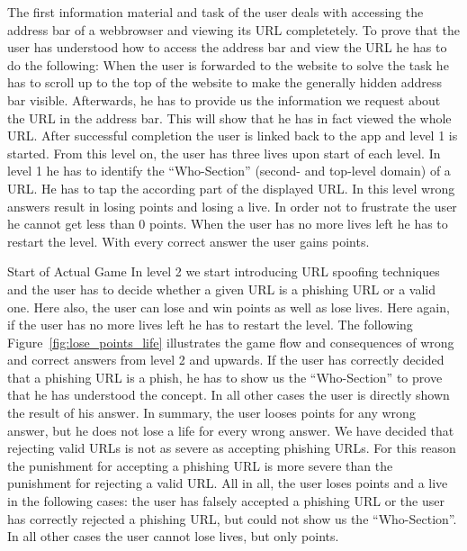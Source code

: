 \begin{description}[leftmargin=0cm]
	\item[Basic Knowledge]  The first information material and task of the user deals with accessing the address bar of a webbrowser and viewing its URL completetely.
 To prove that the user has understood how to access the address bar and view the URL he has to do the following: When the user is forwarded to the website to solve the task he has to scroll up to the top of the website to make the generally hidden address bar visible.
 Afterwards, he has to provide us the information we request about the URL in the address bar.
 This will show that he has in fact viewed the whole URL.
 After successful completion the user is linked back to the app and level 1 is started.
 From this level on, the user has three lives upon start of each level.
 In level 1 he has to identify the ``Who-Section'' (second- and top-level domain) of a URL.
 He has to tap the according part of the displayed URL.
 In this level wrong answers result in losing points and losing a live.
 In order not to frustrate the user he cannot get less than 0 points.
 When the user has no more lives left he has to restart the level.
 With every correct answer the user gains points.
	\item{Start of Actual Game}  In level 2 we start introducing URL spoofing techniques and the user has to decide whether a given URL is a phishing URL or a valid one.
 Here also, the user can lose and win points as well as lose lives.
 Here again, if the user has no more lives left he has to restart the level.
 The following Figure~\ref{fig:lose_points_life} illustrates the game flow and consequences of wrong and correct answers from level 2 and upwards.
 If the user has correctly decided that a phishing URL is a phish, he has to show us the ``Who-Section'' to prove that he has understood the concept.
 In all other cases the user is directly shown the result of his answer.
 In summary, the user looses points for any wrong answer, but he does not lose a life for every wrong answer.
 We have decided that rejecting valid URLs is not as severe as accepting phishing URLs.
 For this reason the punishment for accepting a phishing URL is more severe than the punishment for rejecting a valid URL.
 All in all, the user loses points and a live in the following cases: the user has falsely accepted a phishing URL or the user has correctly rejected a phishing URL, but could not show us the ``Who-Section''. In all other cases the user cannot lose lives, but only points.
\end{description}
 
